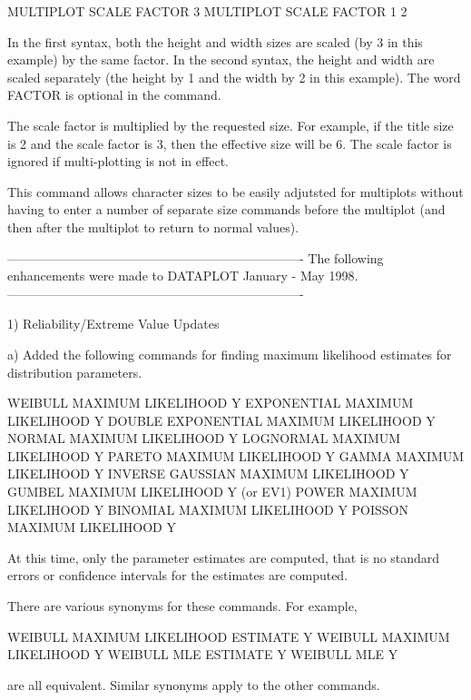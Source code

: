 {        MULTIPLOT SCALE FACTOR 3
        MULTIPLOT SCALE FACTOR 1 2

    In the first syntax, both the height and width sizes are
    scaled (by 3 in this example) by the same factor.  In the
    second syntax, the height and width are scaled separately
    (the height by 1 and the width by 2 in this example).
    The word FACTOR is optional in the command.

    The scale factor is multiplied by the requested size.  For
    example, if the title size is 2 and the scale factor is 3,
    then the effective size will be 6.  The scale factor is
    ignored if multi-plotting is not in effect.

    This command allows character sizes to be easily adjutsted
    for multiplots without having to enter a number of separate
    size commands before the multiplot (and then after the 
    multiplot to return to normal values).

----------------------------------------------------------------------
The following enhancements were made to DATAPLOT January - May   1998.
----------------------------------------------------------------------

 1) Reliability/Extreme Value Updates

    a) Added the following commands for finding maximum likelihood
       estimates for distribution parameters.

          WEIBULL MAXIMUM LIKELIHOOD Y
          EXPONENTIAL MAXIMUM LIKELIHOOD Y
          DOUBLE EXPONENTIAL MAXIMUM LIKELIHOOD Y
          NORMAL MAXIMUM LIKELIHOOD Y
          LOGNORMAL MAXIMUM LIKELIHOOD Y
          PARETO MAXIMUM LIKELIHOOD Y
          GAMMA MAXIMUM LIKELIHOOD Y
          INVERSE GAUSSIAN MAXIMUM LIKELIHOOD Y
          GUMBEL MAXIMUM LIKELIHOOD Y (or EV1)
          POWER MAXIMUM LIKELIHOOD Y
          BINOMIAL MAXIMUM LIKELIHOOD Y
          POISSON MAXIMUM LIKELIHOOD Y

       At this time, only the parameter estimates are computed,
       that is no standard errors or confidence intervals for the
       estimates are computed.

   
       There are various synonyms for these commands.  For example,
   
             WEIBULL MAXIMUM LIKELIHOOD ESTIMATE Y
             WEIBULL MAXIMUM LIKELIHOOD Y
             WEIBULL MLE ESTIMATE Y
             WEIBULL MLE Y
   
       are all equivalent.  Similar synonyms apply to the other
       commands.

}
